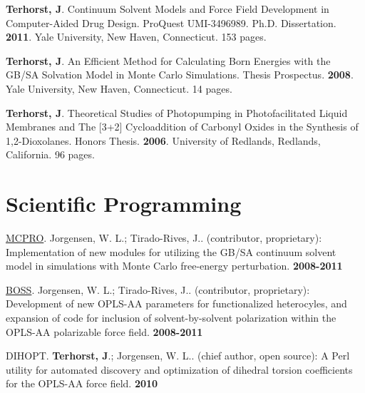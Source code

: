 \documentclass[10pt]{article}
\newcommand*\thesis[7]{#1 #2 #3. \textbf{#4}. #5, #6. {#7 pages.}}
\newcommand*\sciprog[5]{#1. #2. (#3): #4 \textbf{#5}}
\begin{document}
\thesis{\textbf{Terhorst, J}.}
{Continuum Solvent Models and Force Field Development in Computer-Aided Drug Design. ProQuest UMI-3496989.}
{Ph.D. Dissertation}{2011}{Yale University}{New Haven, Connecticut}{153} 

\thesis{\textbf{Terhorst, J}.}
{An Efficient Method for Calculating Born Energies with the GB/SA Solvation Model in Monte Carlo Simulations.}
{Thesis Prospectus}{2008}{Yale University}{New Haven, Connecticut}{14}

\thesis{\textbf{Terhorst, J}.}
{Theoretical Studies of Photopumping in Photofacilitated Liquid Membranes and The [3+2] Cycloaddition of Carbonyl Oxides in the Synthesis of 1,2-Dioxolanes.}
{Honors Thesis}{2006}{University of Redlands}{Redlands, California}{96}


\section{Scientific Programming}

\sciprog{\href{http://zarbi.chem.yale.edu/software.html}{MCPRO}}
{Jorgensen, W. L.; Tirado-Rives, J.}
{contributor, proprietary}
{Implementation of new modules for utilizing the GB/SA continuum solvent 
model in simulations with Monte Carlo free-energy perturbation.}
{2008-2011}

\sciprog{\href{http://zarbi.chem.yale.edu/software.html}{BOSS}}
{Jorgensen, W. L.; Tirado-Rives, J.}
{contributor, proprietary}
{Development of new OPLS-AA parameters for 
functionalized heterocyles, and expansion of code for 
inclusion of solvent-by-solvent polarization within the 
OPLS-AA polarizable force field.}
{2008-2011}

\sciprog{DIHOPT}
{\textbf{Terhorst, J}.; Jorgensen, W. L.}
{chief author, open source}
{A Perl utility for automated discovery and optimization 
of dihedral torsion coefficients for the OPLS-AA force field.}
{2010}

\end{document}
